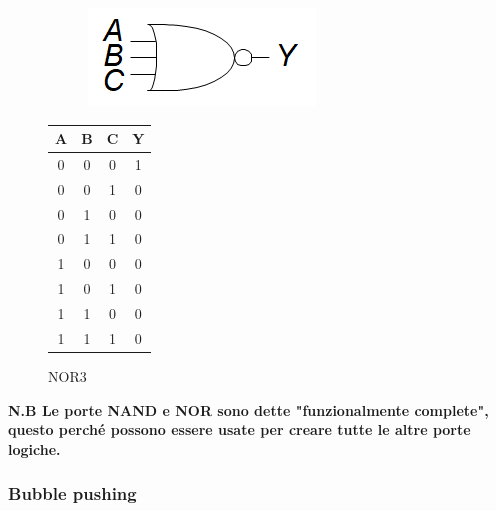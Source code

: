 \documentclass{article}
\begin{document}
\begin{figure}[ht]
    \begin{minipage}[t]{0.49\textwidth}
        \centering
        \begin{figure}[H]
        \centering
        \includegraphics[width=.55\linewidth]{NOR3.png}
        \end{figure}
        \label{fig:nor3}
    \end{minipage}
    \begin{minipage}[t]{0.49\textwidth}
    \centering
        \begin{table}[H]
        \centering
        \begin{tabular}{ccc|c}
            A & B & C & Y\\
            \hline
            0 & 0 & 0 & 1\\
            \hline
            0 & 0 & 1 & 0\\
            \hline
            0 & 1 & 0 & 0\\
            \hline
            0 & 1 & 1 & 0\\
            \hline
            1 & 0 & 0 & 0\\
            \hline
            1 & 0 & 1 & 0\\
            \hline
            1 & 1 & 0 & 0\\
            \hline
            1 & 1 & 1 & 0\\
        \end{tabular}
    \label{tab:nor3}
    \end{table}
\end{minipage}
\caption{NOR3}
\end{figure}

\vspace{5pt}

\textbf{N.B Le porte NAND e NOR sono dette "funzionalmente complete", questo perché possono essere usate per creare tutte le altre porte logiche.}

\vspace{5pt}

\subsubsection{Bubble pushing}
\end{document}
